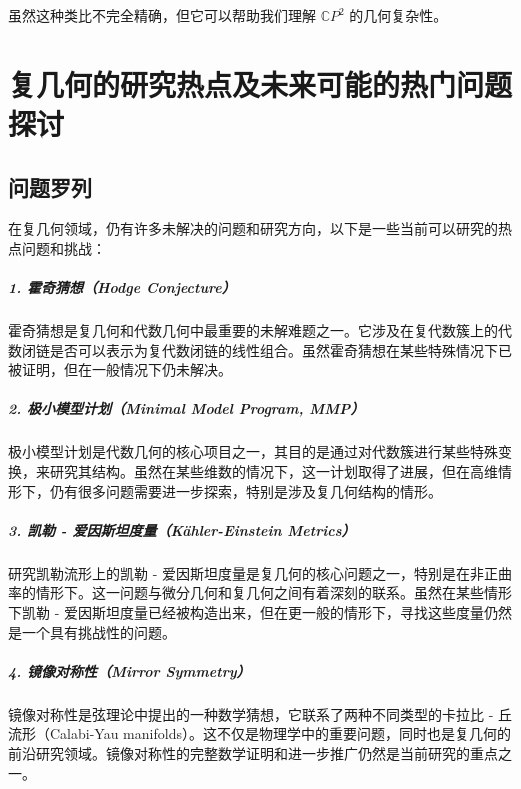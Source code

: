 \documentclass[lang=cn,zihao=5,twoside,fontset=none]{textbook}
\begin{document}
虽然这种类比不完全精确，但它可以帮助我们理解 $\mathbb{C}P^2$ 的几何复杂性。

\chapter{复几何的研究热点及未来可能的热门问题探讨}

\section{问题罗列}

在复几何领域，仍有许多未解决的问题和研究方向，以下是一些当前可以研究的热点问题和挑战：

\paragraph*{1. \textbf{霍奇猜想（Hodge Conjecture）}}
   霍奇猜想是复几何和代数几何中最重要的未解难题之一。它涉及在复代数簇上的代数闭链是否可以表示为复代数闭链的线性组合。虽然霍奇猜想在某些特殊情况下已被证明，但在一般情况下仍未解决。

\paragraph*{2. \textbf{极小模型计划（Minimal Model Program, MMP）}}
   极小模型计划是代数几何的核心项目之一，其目的是通过对代数簇进行某些特殊变换，来研究其结构。虽然在某些维数的情况下，这一计划取得了进展，但在高维情形下，仍有很多问题需要进一步探索，特别是涉及复几何结构的情形。

\paragraph*{3. \textbf{凯勒 - 爱因斯坦度量（Kähler-Einstein Metrics）}}
   研究凯勒流形上的凯勒 - 爱因斯坦度量是复几何的核心问题之一，特别是在非正曲率的情形下。这一问题与微分几何和复几何之间有着深刻的联系。虽然在某些情形下凯勒 - 爱因斯坦度量已经被构造出来，但在更一般的情形下，寻找这些度量仍然是一个具有挑战性的问题。

\paragraph*{4. \textbf{镜像对称性（Mirror Symmetry）}}
   镜像对称性是弦理论中提出的一种数学猜想，它联系了两种不同类型的卡拉比 - 丘流形（Calabi-Yau manifolds）。这不仅是物理学中的重要问题，同时也是复几何的前沿研究领域。镜像对称性的完整数学证明和进一步推广仍然是当前研究的重点之一。
\end{document}

